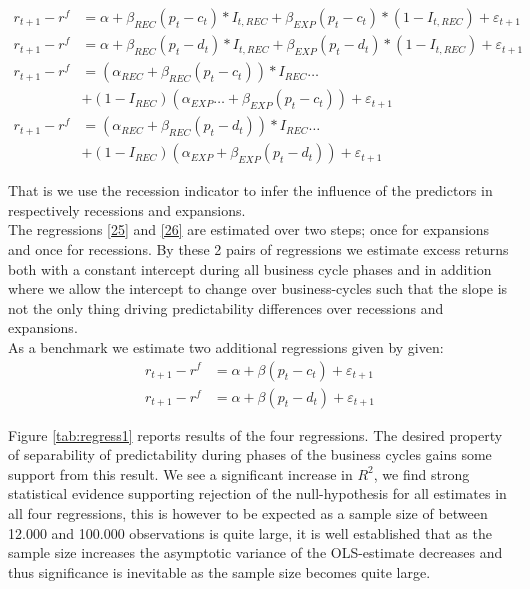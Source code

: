 \begin{align}
     r_{t+1} - r^{f} &= \alpha + \beta_{REC} \left( p_t - c_t \right) * I_{t,REC} + \beta_{EXP} \left( p_t - c_t \right) * \left(1 - I_{t,REC}\right)  + \varepsilon_{t+1} \label{23}\\
      r_{t+1} - r^{f} &= \alpha + \beta_{REC} \left( p_t - d_t \right) * I_{t,REC} + \beta_{EXP} \left( p_t - d_t \right) * \left(1 - I_{t,REC}\right)  + \varepsilon_{t+1} \label{24}\\
      r_{t+1} - r^{f} &= \left(\alpha_{REC} + \beta_{REC} \left(p_t - c_t\right)\right)*I_{REC}\dots \nonumber\\
      & + \left(1-I_{REC}\right) \left( \alpha_{EXP}\dots + \beta_{EXP}\left(p_t - c_t \right) \right) + \varepsilon_{t+1} \label{25}\\
r_{t+1} - r^{f} &= \left(\alpha_{REC} + \beta_{REC} \left(p_t - d_t\right)\right)*I_{REC}\dots \nonumber\\
& + \left(1-I_{REC}\right) \left( \alpha_{EXP} + \beta_{EXP}\left(p_t - d_t \right) \right) + \varepsilon_{t+1} \label{26}      
\end{align}



That is we use the recession indicator to infer the influence of the predictors in respectively recessions and expansions.\\

The regressions \eqref{25} and \eqref{26} are estimated over two steps; once for expansions and once for recessions. By these 2 pairs of regressions we estimate excess returns both with a constant intercept during all business cycle phases and in addition where we allow the intercept to change over business-cycles such that the slope is not the only thing driving predictability differences over recessions and expansions.\\

As a benchmark we estimate two additional regressions given by given:
\begin{align*}
     r_{t+1} - r^{f} &= \alpha + \beta \left( p_t - c_t \right)  + \varepsilon_{t+1}\\
      r_{t+1} - r^{f} &= \alpha + \beta \left( p_t - d_t \right) + \varepsilon_{t+1}
\end{align*}

Figure \ref{tab:regress1} reports results of the four regressions. The desired property of separability of predictability during phases of the business cycles gains some support from this result. We see a significant increase in $R^2$, we find strong statistical evidence supporting rejection of the null-hypothesis for all estimates in all four regressions, this is however to be expected as a sample size of between 12.000 and 100.000 observations is quite large, it is well established that as the sample size increases the asymptotic variance of the OLS-estimate decreases and thus significance is inevitable as the sample size becomes quite large.


